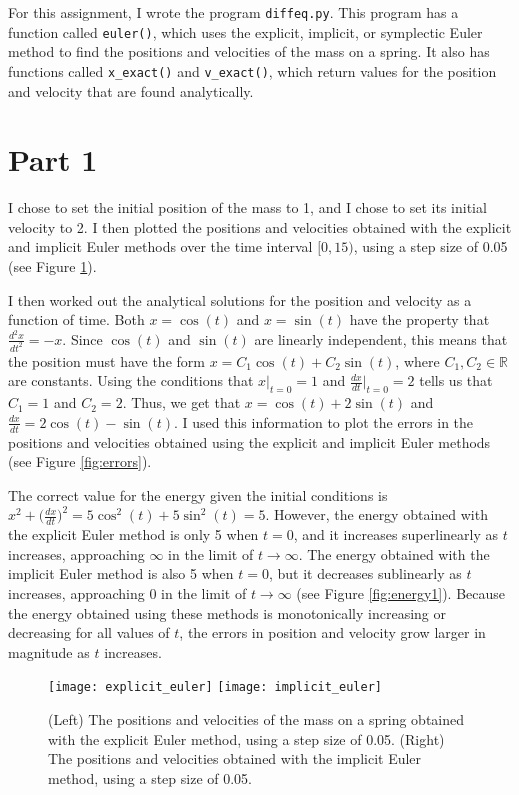 \documentclass[11pt]{article}
\begin{document}
For this assignment, I wrote the program \verb|diffeq.py|. This program has a function called \verb|euler()|, which uses the explicit, implicit, or symplectic Euler method to find the positions and velocities of the mass on a spring. It also has functions called \verb|x_exact()| and \verb|v_exact()|, which return values for the position and velocity that are found analytically.

\section*{Part 1}
I chose to set the initial position of the mass to 1, and I chose to set its initial velocity to 2. I then plotted the positions and velocities obtained with the explicit and implicit Euler methods over the time interval $[0, 15)$, using a step size of 0.05 (see Figure \ref{fig:positionsAndVelocities1}).

I then worked out the analytical solutions for the position and velocity as a function of time. Both $x = \cos(t)$ and $x = \sin(t)$ have the property that $\frac{d^2x}{dt^2} = -x$. Since $\cos(t)$ and $\sin(t)$ are linearly independent, this means that the position must have the form $x = C_1\cos(t) + C_2\sin(t)$, where $C_1, C_2 \in \mathbb{R}$ are constants. Using the conditions that $x\bigr|_{t = 0} = 1$ and $\frac{dx}{dt}\bigr|_{t = 0} = 2$ tells us that $C_1 = 1$ and $C_2 = 2$. Thus, we get that $x = \cos(t) + 2\sin(t)$ and $\frac{dx}{dt} = 2\cos(t) - \sin(t)$. I used this information to plot the errors in the positions and velocities obtained using the explicit and implicit Euler methods (see Figure \ref{fig:errors}).

The correct value for the energy given the initial conditions is $x^2 + \bigl(\frac{dx}{dt}\bigr)^2 = 5\cos^2(t) + 5\sin^2(t) = 5$. However, the energy obtained with the explicit Euler method is only 5 when $t = 0$, and it increases superlinearly as $t$ increases, approaching $\infty$ in the limit of $t \to \infty$. The energy obtained with the implicit Euler method is also 5 when $t = 0$, but it decreases sublinearly as $t$ increases, approaching 0 in the limit of $t \to \infty$ (see Figure \ref{fig:energy1}). Because the energy obtained using these methods is monotonically increasing or decreasing for all values of $t$, the errors in position and velocity grow larger in magnitude as $t$ increases.

\vfill

\begin{figure}[H]
\texttt{[image: explicit\_euler]} \hspace{0.7em} \texttt{[image: implicit\_euler]}\\
\caption{(Left) The positions and velocities of the mass on a spring obtained with the explicit Euler method, using a step size of 0.05. (Right) The positions and velocities obtained with the implicit Euler method, using a step size of 0.05.}
\label{fig:positionsAndVelocities1}
\end{figure}
\end{document}

